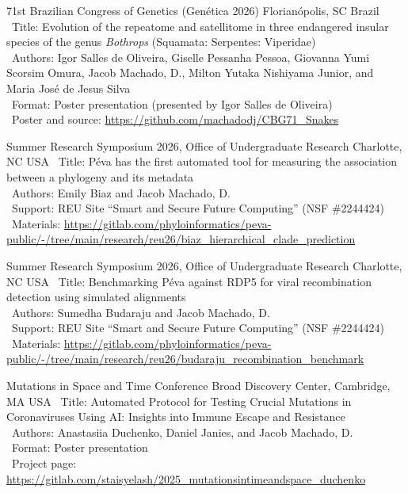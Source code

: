\documentclass[11pt, letterpaper, sans]{moderncv}
\begin{document}
    {71st Brazilian Congress of Genetics (Genética 2026)}
    {Florianópolis, SC}
    {Brazil}
    {}
    {
        \textbullet~Title: Evolution of the repeatome and satellitome in three endangered insular species of the genus \textit{Bothrops} (Squamata: Serpentes: Viperidae)\\
        \textbullet~Authors: Igor Salles de Oliveira, Giselle Pessanha Pessoa, Giovanna Yumi Scorsim Omura, Jacob Machado, D., Milton Yutaka Nishiyama Junior, and Maria José de Jesus Silva\\
        \textbullet~Format: Poster presentation (presented by Igor Salles de Oliveira)\\
        \textbullet~Poster and source: \url{https://github.com/machadodj/CBG71_Snakes}
    }

    {Summer Research Symposium 2026, Office of Undergraduate Research}
    {Charlotte, NC}
    {USA}
    {}
    {
        \textbullet~Title: Péva has the first automated tool for measuring the association between a phylogeny and its metadata\\
        \textbullet~Authors: Emily Biaz and Jacob Machado, D.\\
        \textbullet~Support: REU Site ``Smart and Secure Future Computing'' (NSF \#2244424)\\
        \textbullet~Materials: \url{https://gitlab.com/phyloinformatics/peva-public/-/tree/main/research/reu26/biaz_hierarchical_clade_prediction}
    }

\cventry{---}
    {Summer Research Symposium 2026, Office of Undergraduate Research}
    {Charlotte, NC}
    {USA}
    {}
    {
        \textbullet~Title: Benchmarking Péva against RDP5 for viral recombination detection using simulated alignments\\
        \textbullet~Authors: Sumedha Budaraju and Jacob Machado, D.\\
        \textbullet~Support: REU Site ``Smart and Secure Future Computing'' (NSF \#2244424)\\
        \textbullet~Materials: \url{https://gitlab.com/phyloinformatics/peva-public/-/tree/main/research/reu26/budaraju_recombination_benchmark}
    }

    {Mutations in Space and Time Conference}
    {Broad Discovery Center, Cambridge, MA}
    {USA}
    {}
    {
        \textbullet~Title: Automated Protocol for Testing Crucial Mutations in Coronaviruses Using AI: Insights into Immune Escape and Resistance\\
        \textbullet~Authors: Anastasiia Duchenko, Daniel Janies, and Jacob Machado, D.\\
        \textbullet~Format: Poster presentation\\
        \textbullet~Project page: \url{https://gitlab.com/staisyelash/2025_mutationsintimeandspace_duchenko}
    }
\end{document}
